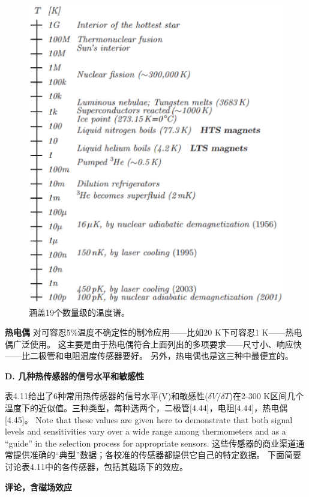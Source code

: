 \begin{figure}[htbp]
	\centering
	\includegraphics[scale=0.6]{chpt4/figs/fig4.19.eps}
	\caption{涵盖19个数量级的温度谱。}
\end{figure}

\textbf{热电偶} 对可容忍5\%温度不确定性的制冷应用——比如20 K下可容忍1 K——热电偶广泛使用。
这主要是由于热电偶符合上面列出的多项要求——尺寸小、响应快——比二极管和电阻温度传感器要好。
另外，热电偶也是这三种中最便宜的。

\textbf{D. 几种热传感器的信号水平和敏感性}

表4.11给出了6种常用热传感器的信号水平(V)和敏感性($\delta V/\delta T$)在2-300 K区间几个温度下的近似值。三种类型，每种选两个，二极管[4.44]，电阻[4.44]，热电偶[4.45]。
Note that these values are given here to demonstrate that both
signal levels and sensitivities vary over a wide range among thermometers and as
a “guide” in the selection process for appropriate sensors. 
这些传感器的商业渠道通常提供准确的“典型”数据；各校准的传感器都提供它自己的特定数据。
下面简要讨论表4.11中的各传感器，包括其磁场下的效应。

\textbf{评论，含磁场效应}

